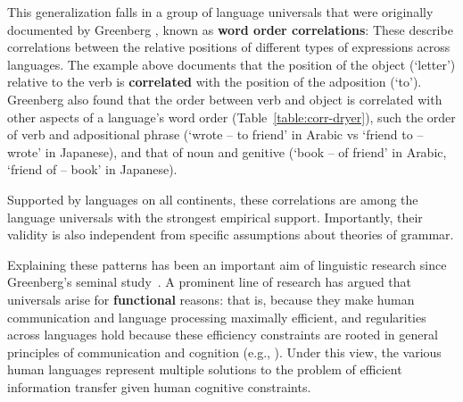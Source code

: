 \documentclass[9pt,twocolumn,twoside,lineno]{pnas-new}
\newcommand{\key}[1]{\textbf{#1}}
\begin{document}
This generalization falls in a group of language universals that were originally documented by Greenberg \cite{greenberg1963universals}, known as \key{word order correlations}:
These describe correlations between the relative positions of different types of expressions across languages.
The example above documents that the position of the object (`letter') relative to the verb is \key{correlated} with the position of the adposition (`to'). %
Greenberg also found that the order between verb and object is correlated with other aspects of a language's word order (Table~\ref{table:corr-dryer}), such the order of verb and adpositional phrase (`wrote -- to friend' in Arabic vs `friend to -- wrote' in Japanese), and that of noun and genitive (`book -- of friend' in Arabic, `friend of -- book' in Japanese).




Supported by languages on all continents, these correlations are among the language universals with the strongest empirical support.
Importantly, their validity is also independent from specific assumptions about theories of grammar.



Explaining these patterns has been an important aim of linguistic research since Greenberg's seminal study~\cite{lehmann1973structural, vennemann1974theoretical,jackendoff1977x,frazier1985syntactic,chomsky1988language, dryer1992greenbergian, hawkins1994performance}.
A prominent line of research has argued that universals arise for \key{functional} reasons: that is, because they make human communication and language processing maximally efficient, and regularities across languages hold because these efficiency constraints are rooted in general principles of communication and cognition (e.g., \cite{gabelentz1901sprachwissenschaft,zipf1949human,hockett1960origin,givon1991markedness,hawkins1994performance,hawkins2004efficiency,hawkins2014crosslinguistic,croft2001functional,haspelmath2008parametric,jaeger2011language}).
Under this view, the various human languages represent multiple solutions to the problem of efficient information transfer given human cognitive constraints.
\end{document}
